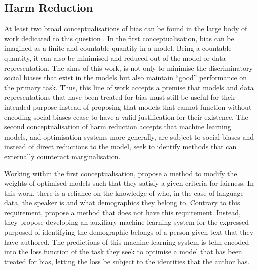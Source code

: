 \subsection{Harm Reduction}
At least two broad conceptualisations of bias can be found in the large body of work dedicated to this question \citep[e.g.][]{Agarwal:2018,Romanov:2019,Kulynych:2020,Bolukbasi:2016,Zhao:2017}.
In the first conceptualisation, bias can be imagined as a finite and countable quantity in a model. 
Being a countable quantity, it can also be minimised and reduced out of the model or data representation.
The aims of this work, is not only to minimise the discriminatory social biases that exist in the models but also maintain ``good'' performance on the primary task.
Thus, this line of work accepts a premise that models and data representations that have been treated for bias must still be useful for their intended purpose instead of proposing that models that cannot function without encoding social biases cease to have a valid justification for their existence.
The second conceptualisation of harm reduction accepts that machine learning models, and optimisation systems more generally, are subject to social biases and instead of direct reductions to the model, seek to identify methods that can externally counteract marginalisation.

Working within the first conceptualisation, \citet{Agarwal:2018} propose a method to modify the weights of optimised models such that they satisfy a given criteria for fairness. 
In this work, there is a reliance on the knowledge of who, in the case of language data, the speaker is and what demographics they belong to.
Contrary to this requirement, \citet{Romanov:2019} propose a method that does not have this requirement. 
Instead, they propose developing an auxiliary machine learning system for the expressed purposed of identifying the demographic belongs of a person given text that they have authored. 
The predictions of this machine learning system is tehn encoded into the loss function of the task they seek to optimise a model that has been treated for bias, letting the loss be subject to the identities that the author has.


